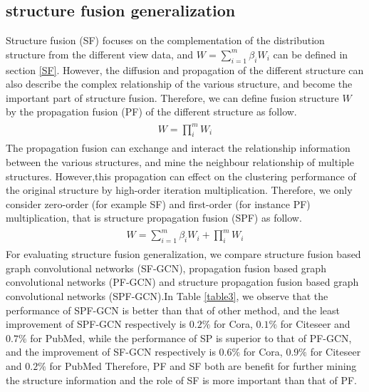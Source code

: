 \documentclass[review]{elsarticle}
\begin{document}
\subsection{structure fusion generalization}
\label{generalization}
Structure fusion (SF) focuses on the complementation of the distribution structure from the different view data, and $W=\sum_{i=1}^{m}\beta_{i}W_{i}$ can be defined in section \ref{SF}.  However, the diffusion \cite{yang2012affinity} \cite{bai2017regularized} \cite{bai2017regularized} and propagation\cite{LINGF2018} \cite{Lin2018structure} of the different structure can also describe the complex relationship of the various structure, and become the important part of structure fusion. Therefore, we can define fusion structure $W$ by the propagation fusion (PF) of the different structure as follow.
\begin{align}
\label{pf1}
\begin{aligned}
W=\prod_{i}^{m}W_{i}
\end{aligned}
\end{align}
The propagation fusion can exchange and interact the relationship information between the various structures, and mine the neighbour relationship of multiple structures. However,this propagation can effect on the clustering performance of the original structure by high-order iteration multiplication. Therefore, we only consider zero-order (for example SF) and first-order (for instance PF) multiplication, that is structure propagation fusion (SPF) as follow.
\begin{align}
\label{pf2}
\begin{aligned}
W=\sum_{i=1}^{m}\beta_{i}W_{i}+\prod_{i}^{m}W_{i}
\end{aligned}
\end{align}
For evaluating structure fusion generalization, we compare structure fusion based graph convolutional networks (SF-GCN), propagation fusion based graph convolutional networks (PF-GCN) and structure propagation fusion based graph convolutional networks (SPF-GCN).In Table \ref{table3}, we observe that the performance of SPF-GCN is better than that of other method, and the least improvement of SPF-GCN respectively is  $0.2\%$ for Cora, $0.1\%$ for Citeseer and $0.7\%$ for PubMed, while the performance of SP is superior to that of PF-GCN, and the improvement of SF-GCN respectively is  $0.6\%$ for Cora, $0.9\%$ for Citeseer and $0.2\%$ for PubMed Therefore, PF and SF both are benefit for further mining the structure information and the role of SF is more important than that of PF.
\end{document}

